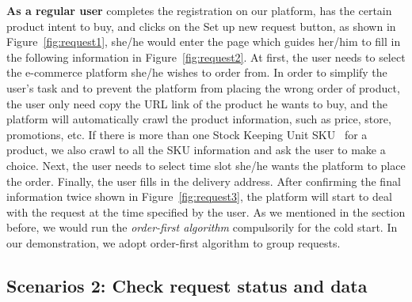 \textbf{As a regular user} completes the registration on our platform, has the certain product intent to buy, and clicks on the Set up new request button, as shown in Figure~\ref{fig:request1}, she/he would enter the page which guides her/him to fill in the following information in Figure~\ref{fig:request2}. 
At first, the user needs to select the e-commerce platform she/he wishes to order from. In order to simplify the user's task and to prevent the platform from placing the wrong order of product, the user only need copy the URL link of the product he wants to buy, and the platform will automatically crawl the product information, such as price, store, promotions, etc. If there is more than one Stock Keeping Unit SKU~\cite{SKU} for a product, we also crawl to all the SKU information and ask the user to make a choice. 
Next, the user needs to select time slot she/he wants the platform to place the order. Finally, the user fills in the delivery address. After confirming the final information twice shown in Figure~\ref{fig:request3}, the platform will start to deal with the request at the time specified by the user. As we mentioned in the section before, we would run the \emph{order-first algorithm} compulsorily for the cold start. In our demonstration, we adopt order-first algorithm to group requests.

\subsection{Scenarios 2: Check request status and data}

